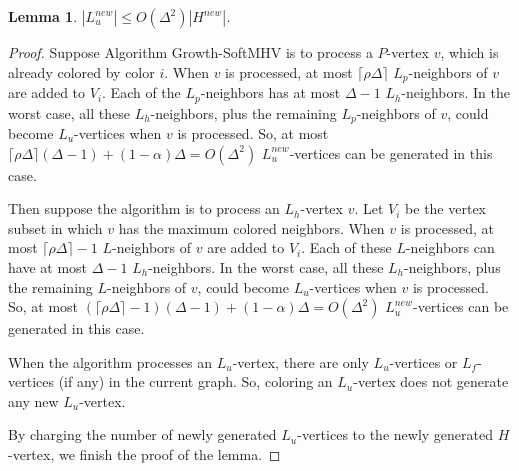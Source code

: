 \documentclass[11pt]{article}
\newtheorem{lemma}{Lemma}[section]
\newcommand{\qed}{\vrule height4pt width4pt depth2pt}
\begin{document}
\begin{lemma}
\label{lm - lower bound on |H^new|, Growth-SoftMHV}
$|L_{u}^{new}| \leq O(\Delta^2) |H^{new}|$.
\end{lemma}
\begin{proof}
Suppose Algorithm {\sc Growth-SoftMHV} is to process a $P$-vertex $v$,
which is already colored by color $i$.
When $v$ is processed, at most $\lceil \rho \Delta \rceil$ $L_p$-neighbors
of $v$ are added to $V_i$. Each of the $L_p$-neighbors has at most
$\Delta - 1$ $L_{h}$-neighbors.
In the worst case, all these $L_{h}$-neighbors,
plus the remaining $L_p$-neighbors of $v$, could become $L_{u}$-vertices
when $v$ is processed. So, at most
$\lceil \rho \Delta \rceil (\Delta-1) + (1-\alpha) \Delta = O(\Delta^2)$
$L_{u}^{new}$-vertices can be generated in this case.

Then suppose the algorithm is to process an $L_{h}$-vertex $v$. Let
$V_i$ be the vertex subset in which $v$ has the maximum colored neighbors.
When $v$ is processed, at most $\lceil \rho \Delta \rceil - 1$ $L$-neighbors
of $v$ are added to $V_i$. Each of these $L$-neighbors can have at most
$\Delta - 1$ $L_{h}$-neighbors. In the worst case,
all these $L_{h}$-neighbors, plus the remaining $L$-neighbors of $v$,
could become $L_{u}$-vertices when $v$ is processed.
So, at most
$(\lceil \rho \Delta \rceil - 1) (\Delta-1) + (1-\alpha) \Delta = O(\Delta^2)$
$L_{u}^{new}$-vertices can be generated in this case.

When the algorithm processes an $L_{u}$-vertex, there are only
$L_{u}$-vertices or $L_f$-vertices (if any) in the current graph.
So, coloring an $L_{u}$-vertex does not generate any new $L_{u}$-vertex.

By charging the number of newly generated $L_{u}$-vertices to the newly
generated $H$-vertex, we finish the proof of the lemma.
\qed
\end{proof}
\end{document}
